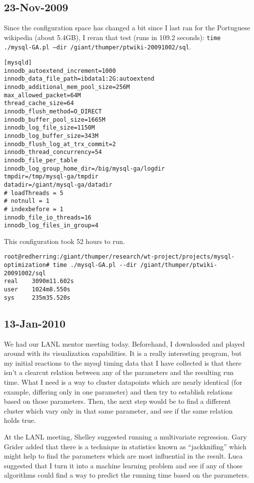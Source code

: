 \subsection{23-Nov-2009}

Since the configuration space has changed a bit since I last ran for
the Portuguese wikipedia (about 5.4GB), I reran that test (runs in 109.2 seconds):
\texttt{time ./mysql-GA.pl --dir /giant/thumper/ptwiki-20091002/sql}.

\begin{verbatim}
[mysqld]
innodb_autoextend_increment=1000
innodb_data_file_path=ibdata1:2G:autoextend
innodb_additional_mem_pool_size=256M
max_allowed_packet=64M
thread_cache_size=64
innodb_flush_method=O_DIRECT
innodb_buffer_pool_size=1665M
innodb_log_file_size=1150M
innodb_log_buffer_size=343M
innodb_flush_log_at_trx_commit=2
innodb_thread_concurrency=54
innodb_file_per_table
innodb_log_group_home_dir=/big/mysql-ga/logdir
tmpdir=/tmp/mysql-ga/tmpdir
datadir=/giant/mysql-ga/datadir
# loadThreads = 5
# notnull = 1
# indexbefore = 1
innodb_file_io_threads=16
innodb_log_files_in_group=4
\end{verbatim}

This configuration took 52 hours to run.
\begin{verbatim}
root@redherring:/giant/thumper/research/wt-project/projects/mysql-optimization# time ./mysql-GA.pl --dir /giant/thumper/ptwiki-20091002/sql
real    3090m11.602s
user    1024m8.550s
sys     235m35.520s
\end{verbatim}

\subsection{13-Jan-2010}

We had our LANL mentor meeting today.
Beforehand, I downloaded  and played around with
its visualization capabilities.
It is a really interesting program, but my initial reactions to the
mysql timing data that I have collected is that there isn't a clearcut
relation between any of the parameters and the resulting run time.
What I need is a way to cluster datapoints which are nearly identical
(for example, differing only in one parameter) and then try to establish
relations based on those parameters.
Then, the next step would be to find a different cluster which vary
only in that same parameter, and see if the same relation holds true.

At the LANL meeting, Shelley suggested running a multivariate
regression.
Gary Grider added that there is a technique in statistics known
as ``jackknifing'' which might help to find the parameters
which are most influential in the result.
Luca suggested that I turn it into a machine learning problem
and see if any of those algorithms could find a way to predict
the running time based on the parameters.

